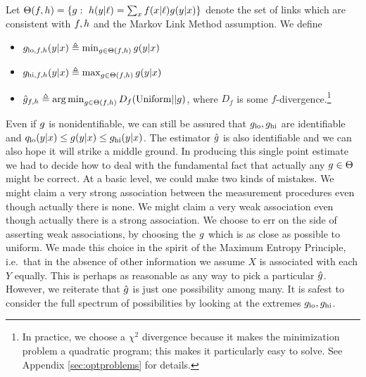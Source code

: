 Let $\Theta(\plx,\ply)=\{\pxy:\ \ply(y|\ell) = \sum_x \plx(x|\ell)\pxy(y|x)\}$ denote the set of links which are consistent with $f,h$ and the Markov Link Method assumption.  We define
\begin{itemize}
    \item $g_{\mathrm{lo},f,h}(y|x) \triangleq \min_{g\in \Theta(f,h)} g(y|x)$
    \item $g_{\mathrm{hi},f,h}(y|x)\triangleq \max_{g\in \Theta(f,h)} g(y|x)$ 
    \item $\hat {g}_{f,h} \triangleq \operatorname*{arg\,min}_{g\in \Theta(f,h)} D_{f}(\mathrm{Uniform}||g)$, where $D_f$ is some $f$-divergence.\footnote{In practice, we choose a $\chi^2$ divergence because it makes the minimization problem a quadratic program; this makes it particularly easy to solve.  See Appendix \ref{sec:optproblems} for details.}
\end{itemize}
Even if $g$ is nonidentifiable, we can still be assured that $g_{\mathrm{lo}}, g_{\mathrm{hi}}$ are identifiable and $q_{\mathrm{lo}}(y|x) \leq g(y|x) \leq g_{\mathrm{hi}}(y|x)$.  The estimator $\hat {g}$ is also identifiable and we can also hope it will strike a middle ground.  In producing this single point estimate we had to decide how to deal with the fundamental fact that actually any $g \in \Theta$ might be correct.  At a basic level, we could make two kinds of mistakes.  We might claim a very strong association between the measurement procedures even though actually there is none.  We might claim a very weak association even though actually there is a strong association.  We choose to err on the side of asserting weak associations, by choosing the $g$ which is as close as possible to uniform.  We made this choice in the spirit of the Maximum Entropy Principle, i.e.\ that in the absence of other information we assume $X$ is associated with each $Y$ equally.  This is perhaps as reasonable as any way to pick a particular $\hat {g}$.  However, we reiterate that $\hat {g}$ is just one possibility among many.  It is safest to consider the full spectrum of possibilities by looking at the extremes $g_{\mathrm{lo}}, g_{\mathrm{hi}}$.

